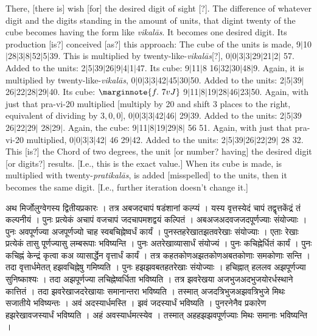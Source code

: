 \documentclass[11pt,a5paper]{book}
\def\pratikalas{\textit{prati\-ka\-l\=as}}
\def\vikalas{\textit{vi\-ka\-l\=as}}
\def\danda{$|$}
\begin{document}
There, [there is] wish [for] the desired digit of sight [?].  The difference of whatever digit and the
digits standing in the amount of units, that digint twenty of the cube  becomes having the form like \vikalas. 
It becomes one desired digit. Its production [is?] conceived [as?] this approach: The cube of the 
units is made, 9\danda 10\danda 28\danda 3\danda 8\danda 52\danda 5\danda 39. 
This is multiplied by twenty-like-\vikalas [?], 0\danda 0\danda 3\danda 3\danda 29\danda 21\danda 2\danda
57. Added to the units: 2\danda 5\danda 39\danda 26\danda 9\danda 4\danda 1\danda 47.
Its cube: 9\danda 11\danda 8 16\danda 32\danda 30\danda 48\danda 9. Again, it is multiplied
by twenty-like-\vikalas, 0\danda 0\danda 3\danda 3\danda 42\danda 45\danda 30\danda 50.
Added to the units: 2\danda 5\danda 39\danda 26\danda 22\danda 28\danda 29\danda 40.
Its cube:
$\marginnote{f.~7v J} $
9\danda 11\danda 8\danda 19\danda 28\danda 46\danda 23\danda 50. 
Again, with just that pra-vi-20 multiplied [multiply by 20 and shift 3 places to the right, 
equivalent of dividing by $3,0,0$], 0\danda 0\danda 3\danda 3\danda 42\danda 46\danda
29\danda 39. Added to the units: 2\danda 5\danda 39 26\danda 22\danda 29\danda 
28\danda 29\danda. Again, the cube: 9\danda 11\danda 8\danda 19\danda 29\danda 8\danda
56 51. Again, with just that pra-vi-20 multiplied, 0\danda 0\danda 3\danda 3\danda 42\danda
46 29\danda 42. Added to the units: 2\danda 5\danda 39\danda 26\danda 22\danda 29\danda
28 32. This [is?] the Chord of two degrees, the unit [or number? having] the desired digit 
[or digits?] results. [I.e., this is the exact value.] 
When its cube is made, is multiplied with twenty-\pratikalas, is added [misspelled] to the units, then it
becomes the same digit. [I.e., further iteration doesn't change it.]

\newpage
{\s अथ मिर्जोलुग्वेगस्य द्वितीयप्रकारः । तत्र अबजदचापं षडंशानां कल्प्यं ।
यस्य वृत्तस्येदं चापं तद्वृत्तकेंद्रं तं कल्पनीयं । पुनः प्रत्येकं अचापं वजचापं जदचापमशद्वयं कल्पितं ।
अबअजअदवजजदपूर्णज्याः संयोज्याः । पुनः 
अवपूर्णज्या अजपूर्णज्यो चाह स्वबचिह्नेष्वर्धं कार्यं । पुनस्तहरेखातझतवरेखाः संयोज्याः । 
एताः रेखाः प्रत्येकं तासु पूर्णज्यासु लम्बरूपाः भविष्यन्ति । पुनः अतरेखाव्यासार्धं संयोज्यं । 
पुनः कचिह्नेर्धितं कार्यं । पुनः कचिह्नं केन्द्रं कृत्वा
कअ व्यासार्द्धेन वृत्तार्धं कार्यं । तत्र कहतकोणअझतकोणअबतकोणाः समकोणाः सन्ति । 
तदा वृत्तार्धमेतत् हझवचिह्नेषु गमिष्यति । पुनः हझझवबतहतरेखाः संयोज्याः । हचिह्नात् हललव अझपूर्णज्या सुनिष्काश्यः । 
तदा अझपूर्णज्या लचिह्नेष्वर्धिता भविष्यति । तत्र झवरेखया अजभुजअदभुजयोरर्धस्थाने कात्तितं । 
तदा झवरेखाजदरेखायाः समानान्तरा भविष्यति । तस्मात् अजदत्रिभुजअझवत्रिभुजे मिथः सजातीये भविष्यन्तः । अवं अदस्यार्धमस्ति ।  
झवं जदस्यार्धं भविष्यति । 
पुनरनेनैव प्रकारेण हझरेखावजस्यार्धं भविष्यति । अहं अवस्यार्धमत्स्येव । तस्मात् अहहझझवपूर्णज्याः मिथः समानाः भविष्यन्ति । }
\end{document}
